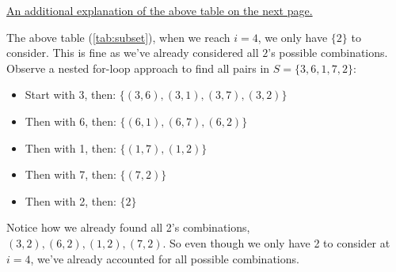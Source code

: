 \vspace{0em}
\begin{table}[h!]
    \centering
    \caption{Subset Sum Dynamic Programming Table (DP Table), where $OTP[i][t]$ is the max combination $P$ of $S_i,\dots,S_n$ s.t., $P\leq t$.}
    \label{tab:subset}
    \end{table}

    \noindent
    \underline{An additional explanation of the above table on the next page.}

    \newpage

    \noindent
    The above table (\ref{tab:subset}), when we reach $i=4$, we only have $\{2\}$ to consider. This is fine as we've
    already considered all $2$'s possible combinations. Observe a nested for-loop approach to find all pairs in $S=\{3,6,1,7,2\}$:

    \begin{itemize}
        \item Start with 3, then: $\{(3,6),(3,1),(3,7),(3,2)\}$
        \item Then with 6, then: $\{(6,1),(6,7),(6,2)\}$
        \item Then with 1, then: $\{(1,7),(1,2)\}$
        \item Then with 7, then: $\{(7,2)\}$
        \item Then with 2, then: $\{2\}$
    \end{itemize}

    \noindent
    Notice how we already found all 2's combinations, $(3,2),(6,2),(1,2),(7,2)$. So even though we only have 2 to consider at $i=4$, we've
    already accounted for all possible combinations.\\

